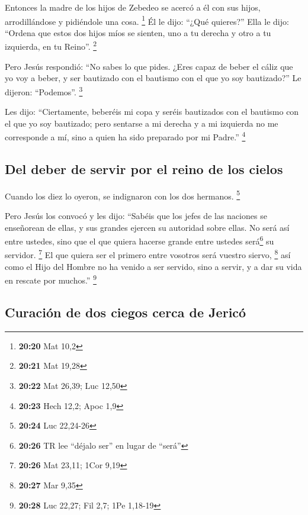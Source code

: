  Entonces la madre de los hijos de Zebedeo se acercó a él
con sus hijos, arrodillándose y pidiéndole una cosa. \footnote{\textbf{20:20}
  Mat 10,2}  Él le dijo: ``¿Qué quieres?'' Ella le dijo:
``Ordena que estos dos hijos míos se sienten, uno a tu derecha y otro a
tu izquierda, en tu Reino''. \footnote{\textbf{20:21} Mat 19,28}

 Pero Jesús respondió: ``No sabes lo que pides. ¿Eres
capaz de beber el cáliz que yo voy a beber, y ser bautizado con el
bautismo con el que yo soy bautizado?'' Le dijeron: ``Podemos''.
\footnote{\textbf{20:22} Mat 26,39; Luc 12,50}

 Les dijo: ``Ciertamente, beberéis mi copa y seréis
bautizados con el bautismo con el que yo soy bautizado; pero sentarse a
mi derecha y a mi izquierda no me corresponde a mí, sino a quien ha sido
preparado por mi Padre.'' \footnote{\textbf{20:23} Hech 12,2; Apoc 1,9}

\hypertarget{del-deber-de-servir-por-el-reino-de-los-cielos}{%
\subsection{Del deber de servir por el reino de los
cielos}\label{del-deber-de-servir-por-el-reino-de-los-cielos}}

 Cuando los diez lo oyeron, se indignaron con los dos
hermanos. \footnote{\textbf{20:24} Luc 22,24-26}

 Pero Jesús los convocó y les dijo: ``Sabéis que los
jefes de las naciones se enseñorean de ellas, y sus grandes ejercen su
autoridad sobre ellas.  No será así entre ustedes, sino
que el que quiera hacerse grande entre ustedes será\footnote{\textbf{20:26}
  TR lee ``déjalo ser'' en lugar de ``será''} su servidor. \footnote{\textbf{20:26}
  Mat 23,11; 1Cor 9,19}  El que quiera ser el primero
entre vosotros será vuestro siervo, \footnote{\textbf{20:27} Mar 9,35}
 así como el Hijo del Hombre no ha venido a ser servido,
sino a servir, y a dar su vida en rescate por muchos.'' \footnote{\textbf{20:28}
  Luc 22,27; Fil 2,7; 1Pe 1,18-19}

\hypertarget{curaciuxf3n-de-dos-ciegos-cerca-de-jericuxf3}{%
\subsection{Curación de dos ciegos cerca de
Jericó}\label{curaciuxf3n-de-dos-ciegos-cerca-de-jericuxf3}}

